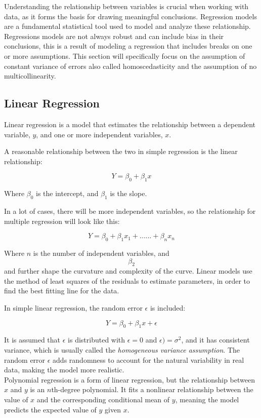 Understanding the relationship between variables is crucial when working with data, as it forms the basis for drawing meaningful conclusions. Regression models are a fundamental statistical tool used to model and analyze these relationship. Regressions models are not always robust and can include bias in their conclusions, this is a result of modeling a regression that includes breaks on one or more assumptions. This section will specifically focus on the assumption of constant variance of errors also called homoscedasticity and the assumption of no multicollinearity.


\subsection{Linear Regression}
Linear regression is a model that estimates the relationship between a dependent variable, \( y \), and one or more independent variables, \( x \).

A reasonable relationship between the two in simple regression is the linear relationship:

\[
Y = \beta_0 + \beta_1 x
\]

Where \( \beta_0 \) is the intercept, and \( \beta_1 \) is the slope.

In a lot of cases, there will be more independent variables, so the relationship for multiple regression will look like this:

\[
Y = \beta_0 + \beta_1 x_1 + ......+ \beta_n x_n
\]



Where \( n \) is the number of independent variables, and $$\beta_2$$ and further shape the curvature and complexity of the curve. Linear models use the method of least squares of the residuals to estimate parameters, in order to find the best fitting line for the data.

In simple linear regression, the random error \( \epsilon \) is included:

\[
Y = \beta_0 + \beta_1 x + \epsilon
\]

It is assumed that \( \epsilon \) is distributed with $\epsilon = 0$ and $\epsilon) = \sigma^2$, and it has consistent variance, which is usually called the \textit{homogeneous variance assumption}. The random error \( \epsilon \) adds randomness to account for the natural variability in real data, making the model more realistic.
\newline\\
Polynomial regression is a form of linear regression, but the relationship between \( x \) and \( y \) is an \( n \)th-degree polynomial. It fits a nonlinear relationship between the value of \( x \) and the corresponding conditional mean of \( y \), meaning the model predicts the expected value of \( y \) given \( x \).

